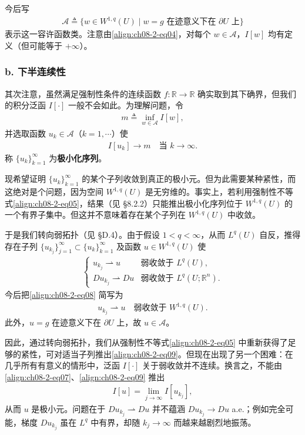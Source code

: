 \documentclass[../../main.tex]{subfiles}
\begin{document}
今后写
\begin{align*}
\mathcal{A}\triangleq\{w\in W^{1,q}(U)\mid w=g\text{ 在迹意义下在 }\partial U\text{ 上}\}
\end{align*}
表示这一容许函数类。注意由\eqref{align:ch08-2-eq04}，对每个 $w\in\mathcal{A}$，$I[w]$ 均有定义（但可能等于 $+\infty$）。

\subsubsection*{b. 下半连续性}

其次注意，虽然满足强制性条件的连续函数 $f:\mathbb{R}\to\mathbb{R}$ 确实取到其下确界，但我们的积分泛函 $I[\cdot]$ 一般不会如此。为理解问题，令
\begin{align}
m\triangleq\inf_{w\in\mathcal{A}}I[w],\label{align:ch08-2-eq06}
\end{align}
并选取函数 $u_k\in\mathcal{A}$（$k=1,\cdots$）使
\begin{align}
I[u_k]\to m\quad\text{当 }k\to\infty.\label{align:ch08-2-eq07}
\end{align}
称 $\{u_k\}_{k=1}^\infty$ 为\textbf{极小化序列}。

现希望证明 $\{u_k\}_{k=1}^\infty$ 的某个子列收敛到真正的极小元。但为此需要某种紧性，而这绝对是个问题，因为空间 $W^{1,q}(U)$ 是无穷维的。事实上，若利用强制性不等式\eqref{align:ch08-2-eq05}，结果（见 \S8.2.2）只能推出极小化序列位于 $W^{1,q}(U)$ 的一个有界子集中。但这并不意味着存在某个子列在 $W^{1,q}(U)$ 中收敛。

于是我们转向弱拓扑（见 \S D.4）。由于假设 $1<q<\infty$，从而 $L^q(U)$ 自反，推得存在子列 $\{u_{k_j}\}_{j=1}^\infty\subset\{u_k\}_{k=1}^\infty$ 及函数 $u\in W^{1,q}(U)$ 使
\begin{align}
\begin{cases}
u_{k_j}\rightharpoonup u&\text{弱收敛于 }L^q(U),\\
Du_{k_j}\rightharpoonup Du&\text{弱收敛于 }L^q(U;\mathbb{R}^n).
\end{cases}\label{align:ch08-2-eq08}
\end{align}
今后把\eqref{align:ch08-2-eq08} 简写为
\begin{align}
u_{k_j}\rightharpoonup u\quad\text{弱收敛于 }W^{1,q}(U).\label{align:ch08-2-eq09}
\end{align}
此外，$u=g$ 在迹意义下在 $\partial U$ 上，故 $u\in\mathcal{A}$。

因此，通过转向弱拓扑，我们从强制性不等式\eqref{align:ch08-2-eq05} 中重新获得了足够的紧性，可对适当子列推出\eqref{align:ch08-2-eq09}。但现在出现了另一个困难：在几乎所有有意义的情形中，泛函 $I[\cdot]$ 关于弱收敛并不连续。换言之，不能由\eqref{align:ch08-2-eq07}、\eqref{align:ch08-2-eq09} 推出
\begin{align}
I[u]=\lim_{j\to\infty}I[u_{k_j}],\label{align:ch08-2-eq10}
\end{align}
从而 $u$ 是极小元。问题在于 $Du_{k_j}\rightharpoonup Du$ 并不蕴涵 $Du_{k_j}\to Du$ a.e.；例如完全可能，梯度 $Du_{k_j}$ 虽在 $L^q$ 中有界，却随 $k_j\to\infty$ 而越来越剧烈地振荡。
\end{document}
